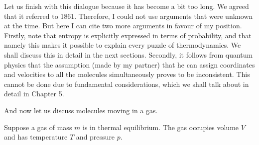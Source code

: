 Let us finish with this dialogue because it has become a bit too long. We agreed that it referred to 1861. Therefore, I could not use arguments that were unknown at the time. But here I can cite two more arguments in favour of my position. Firstly, note that entropy is explicitly expressed in terms of probability, and that namely this makes it possible to explain every puzzle of thermodynamics. We shall discuss this in detail in the next sections. Secondly, it follows from quantum physics that the assumption (made by my partner) that he can assign coordinates and velocities to all the molecules simultaneously proves to be inconsistent. This cannot be done due to fundamental considerations, which we shall talk about in detail in Chapter 5. 

And now let us discuss molecules moving in a gas.

 Suppose a gas of mass $m$ is in thermal equilibrium. The gas occupies volume $V$ and has temperature $T$ and pressure $p$.

